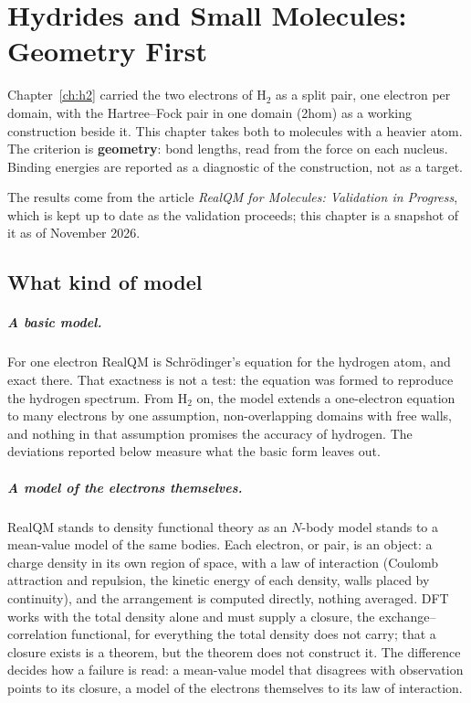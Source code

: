 \chapter{Hydrides and Small Molecules: Geometry First}\label{ch:hydrides}

Chapter~\ref{ch:h2} carried the two electrons of H$_2$ as a split pair, one electron per domain, with
the Hartree--Fock pair in one domain (2hom) as a working construction beside it. This chapter takes both
to molecules with a heavier atom. The criterion is \textbf{geometry}: bond lengths,
read from the force on each nucleus. Binding energies are reported as a diagnostic of the construction,
not as a target.

The results come from the article \emph{RealQM for Molecules: Validation in Progress}, which is kept up
to date as the validation proceeds; this chapter is a snapshot of it as of November 2026.

\section{What kind of model}\label{sec:hydride-model}

\paragraph{A basic model.} For one electron RealQM is Schr\"odinger's equation for the hydrogen atom, and
exact there. That exactness is not a test: the equation was formed to reproduce the hydrogen spectrum. From
H$_2$ on, the model extends a one-electron equation to many electrons by one assumption, non-overlapping
domains with free walls, and nothing in that assumption promises the accuracy of hydrogen. The deviations
reported below measure what the basic form leaves out.

\paragraph{A model of the electrons themselves.} RealQM stands to density functional theory as an $N$-body
model stands to a mean-value model of the same bodies. Each electron, or pair, is an object: a charge
density in its own region of space, with a law of interaction (Coulomb attraction and repulsion, the kinetic
energy of each density, walls placed by continuity), and the arrangement is computed directly, nothing
averaged. DFT works with the total density alone and must supply a closure, the exchange--correlation
functional, for everything the total density does not carry; that a closure exists is a theorem, but the
theorem does not construct it. The difference decides how a failure is read: a mean-value model that
disagrees with observation points to its closure, a model of the electrons themselves to its law of
interaction.

